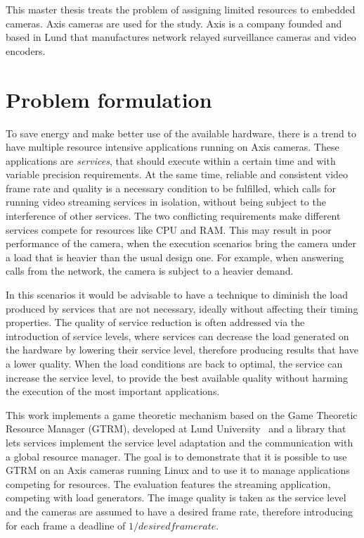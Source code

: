 \documentclass[nobiblatex]{LTHthesis}
\begin{document}
This master thesis treats the problem of assigning limited resources to
embedded cameras. Axis cameras are used for the study. Axis is a company
founded and based in Lund that manufactures network relayed surveillance
cameras and video encoders.

\section{Problem formulation}

To save energy and make better use of the available hardware, there is a
trend to have multiple resource intensive applications running on Axis
cameras. These applications are \emph{services}, that should execute within
a certain time and with variable precision requirements. At the same time,
reliable and consistent video frame rate and quality is a necessary
condition to be fulfilled, which calls for running video streaming
services in isolation, without being subject to the interference of
other services. The two conflicting requirements make different services 
compete for resources like CPU and RAM. This may result in poor performance 
of the camera, when the execution scenarios bring the camera under a load
that is heavier than the usual design one. For example, when answering calls
from the network, the camera is subject to a heavier demand. 

In this scenarios it would be advisable to have a technique to diminish
the load produced by services that are not necessary, ideally without
affecting their timing properties. The quality of service reduction is
often addressed via the introduction of service levels, where services can
decrease the load generated on the hardware by lowering their service level,
therefore producing results that have a lower quality. When the load
conditions are back to optimal, the service can increase the service level,
to provide the best available quality without harming the execution of the
most important applications.

This work implements a game theoretic mechanism based on the Game Theoretic 
Resource Manager (GTRM), developed at Lund University~\cite{gtrm} and a
library that lets services implement the service level adaptation and the
communication with a global resource manager. The goal is to demonstrate
that it is possible to use GTRM on an Axis cameras running Linux and to use
it to manage applications competing for resources. The evaluation features
the streaming application, competing with load generators. The image quality
is taken as the service level and the cameras are assumed to have a desired
frame rate, therefore introducing for each frame a deadline of 
\(1/desired framerate\).
\end{document}
